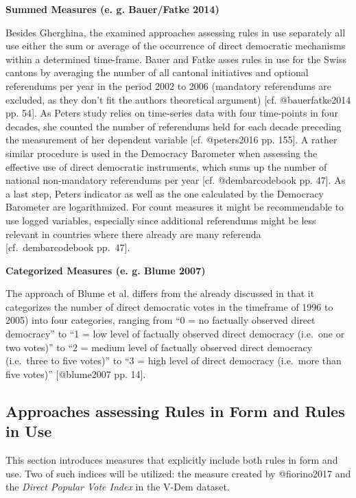 \documentclass[]{article}
\begin{document}
\textbf{Summed Measures (e. g. Bauer/Fatke 2014)}

Besides Gherghina, the examined approaches assessing rules in use
separately all use either the sum or average of the occurrence of direct
democratic mechanisms within a determined time-frame. Bauer and Fatke
asses rules in use for the Swiss cantons by averaging the number of all
cantonal initiatives and optional referendums per year in the period
2002 to 2006 (mandatory referendums are excluded, as they don't fit the
authors theoretical argument) {[}cf. @bauerfatke2014 pp. 54{]}. As
Peters study relies on time-series data with four time-points in four
decades, she counted the number of referendums held for each decade
preceding the measurement of her dependent variable {[}cf. @peters2016
pp. 155{]}. A rather similar procedure is used in the Democracy
Barometer when assessing the effective use of direct democratic
instruments, which sums up the number of national non-mandatory
referendums per year {[}cf. @dembarcodebook pp. 47{]}. As a last step,
Peters indicator as well as the one calculated by the Democracy
Barometer are logarithmized. For count measures it might be
recommendable to use logged variables, especially since additional
referendums might be less relevant in countries where there already are
many referenda {[}cf.~dembarcodebook pp.~47{]}.

\textbf{Categorized Measures (e. g. Blume 2007)}

The approach of Blume et al. differs from the already discussed in that
it categorizes the number of direct democratic votes in the timeframe of
1996 to 2005) into four categories, ranging from ``0 = no factually
observed direct democracy'' to ``1 = low level of factually observed
direct democracy (i.e.~one or two votes)'' to ``2 = medium level of
factually observed direct democracy (i.e.~three to five votes)'' to ``3
= high level of direct democracy (i.e.~more than five votes)''
{[}@blume2007 pp. 14{]}.

\clearpage

\subsection{Approaches assessing Rules in Form and Rules in
Use}\label{approaches-assessing-rules-in-form-and-rules-in-use}

This section introduces measures that explicitly include both rules in
form and use. Two of such indices will be utilized: the measure created
by @fiorino2017 and the \emph{Direct Popular Vote Index} in the V-Dem
dataset.
\end{document}

